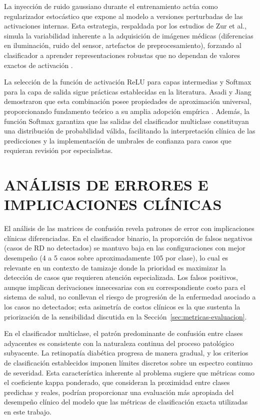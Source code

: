 La inyección de ruido gaussiano durante el entrenamiento actúa como regularizador
estocástico que expone al modelo a versiones perturbadas de las activaciones internas.
Esta estrategia, respaldada por los estudios de Zur et al., simula la variabilidad
inherente a la adquisición de imágenes médicas (diferencias en iluminación, ruido del
sensor, artefactos de preprocesamiento), forzando al clasificador a aprender
representaciones robustas que no dependan de valores exactos de activación
.

La selección de la función de activación ReLU para capas intermedias y Softmax para la
capa de salida sigue prácticas establecidas en la literatura. Asadi y Jiang demostraron
que esta combinación posee propiedades de aproximación universal, proporcionando
fundamento teórico a su amplia adopción empírica .
Además, la función Softmax garantiza que las salidas del clasificador multiclase
constituyan una distribución de probabilidad válida, facilitando la interpretación
clínica de las predicciones y la implementación de umbrales de confianza para casos que
requieran revisión por especialistas.

\section{ANÁLISIS DE ERRORES E IMPLICACIONES CLÍNICAS}

El análisis de las matrices de confusión revela patrones de error con implicaciones
clínicas diferenciadas. En el clasificador binario, la proporción de falsos negativos
(casos de RD no detectados) se mantuvo baja en las configuraciones con mejor desempeño
(4 a 5 casos sobre aproximadamente 105 por clase), lo cual es relevante en un contexto de
tamizaje donde la prioridad es maximizar la detección de casos que requieren atención
especializada. Los falsos positivos, aunque implican derivaciones innecesarias con su
correspondiente costo para el sistema de salud, no conllevan el riesgo de progresión de
la enfermedad asociado a los casos no detectados; esta asimetría de costos clínicos es la
que sustenta la priorización de la sensibilidad discutida en la
Sección~\ref{sec:metricas-evaluacion}.

En el clasificador multiclase, el patrón predominante de confusión entre clases
adyacentes es consistente con la naturaleza continua del proceso patológico subyacente.
La retinopatía diabética progresa de manera gradual, y los criterios de clasificación
establecidos imponen límites discretos sobre un espectro continuo de severidad. Esta
característica inherente al problema sugiere que métricas como el coeficiente kappa
ponderado, que consideran la proximidad entre clases predichas y reales, podrían
proporcionar una evaluación más apropiada del desempeño clínico del modelo que las
métricas de clasificación exacta utilizadas en este trabajo.


